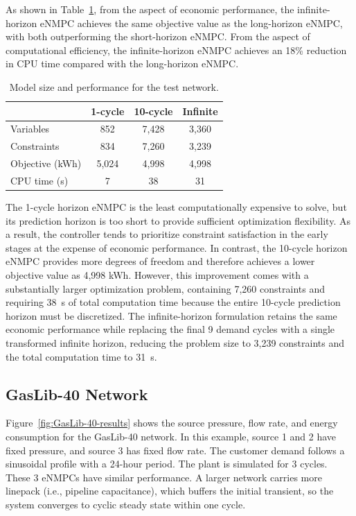 \documentclass[11pt]{article}
\begin{document}
As shown in Table~\ref{tab:test-performance}, from the aspect of economic performance, the infinite-horizon eNMPC achieves the same objective value as the long-horizon eNMPC, with both outperforming the short-horizon eNMPC. From the aspect of computational efficiency, the infinite-horizon eNMPC achieves an 18\% reduction in CPU time compared with the long-horizon eNMPC.

\vspace{8pt}     
\begin{table}[H]
    \centering
    \caption{Model size and performance for the test network.}
    \label{tab:test-performance}
    \begin{tabular}{lccc}
        \toprule
         & 1-cycle & 10-cycle & Infinite \\
        \midrule
        Variables       & 852   & 7,428 & 3,360 \\
        Constraints     & 834   & 7,260 & 3,239 \\
        Objective (kWh) & 5,024 & 4,998 & 4,998 \\
        CPU time (s)    & 7     & 38    & 31    \\
        \bottomrule
    \end{tabular}
\end{table}

The 1-cycle horizon eNMPC is the least computationally expensive to solve, but its prediction horizon is too short to provide sufficient optimization flexibility. As a result, the controller tends to prioritize constraint satisfaction in the early stages at the expense of economic performance. In contrast, the 10-cycle horizon eNMPC provides more degrees of freedom and therefore achieves a lower objective value as 4,998 kWh. However, this improvement comes with a substantially larger optimization problem, containing 7,260 constraints and requiring 38~s of total computation time because the entire 10-cycle prediction horizon must be discretized. The infinite-horizon formulation retains the same economic performance while replacing the final 9 demand cycles with a single transformed infinite horizon, reducing the problem size to 3,239 constraints and the total computation time to 31~s.

\subsection{GasLib-40 Network}

Figure~\ref{fig:GasLib-40-results} shows the source pressure, flow rate, and energy consumption for the GasLib-40 network. In this example, source 1 and 2 have fixed pressure, and source 3 has fixed flow rate. The customer demand follows a sinusoidal profile with a 24-hour period. The plant is simulated for 3 cycles. These 3 eNMPCs have similar performance. A larger network carries more linepack (i.e., pipeline capacitance), which buffers the initial transient, so the system converges to cyclic steady state within one cycle.
\end{document}
